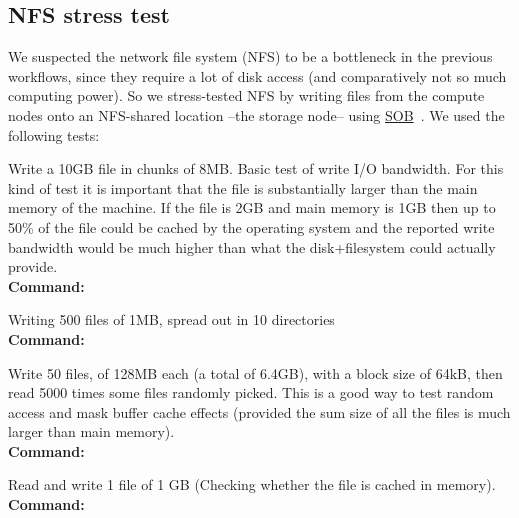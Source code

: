 \subsection{NFS stress test}
\label{experiments:NFS}

We suspected the network file system (NFS) to be a bottleneck in the
previous workflows, since they require a lot of disk access (and
comparatively not so much computing power). So we stress-tested NFS by
writing files from the compute nodes onto an NFS-shared location --the
storage node-- using
\href{https://www.pdc.kth.se/~pek/sob}{SOB}~\cite{sob}.
%
We used the following tests:

\begin{dazenumerate}
%
\item\label{experiments:SOB:test:big}%
  Write a 10GB file in chunks of 8MB. Basic test of write I/O
  bandwidth.  For this kind of test it is important that the file is
  substantially larger than the main memory of the machine. If the
  file is 2GB and main memory is 1GB then up to 50\% of the file could
  be cached by the operating system and the reported write bandwidth
  would be much higher than what the disk+filesystem could actually
  provide.
  \\\textbf{Command:}\ 
\item\label{experiments:SOB:test:dir}%
  Writing 500 files of 1MB, spread out in 10 directories
  \\\textbf{Command:}\ 
\item\label{experiments:SOB:test:random}%
  Write 50 files, of 128MB each (\ie a total of 6.4GB), with a block
  size of 64kB, then read 5000 times some files randomly picked. This
  is a good way to test random access and mask buffer cache effects
  (provided the sum size of all the files is much larger than main
  memory).
  \\\textbf{Command:}\ 
\item\label{experiments:SOB:test:cache}%
  Read and write 1 file of 1 GB (Checking whether the file is cached in memory).
  \\\textbf{Command:}\ 
\end{dazenumerate}

